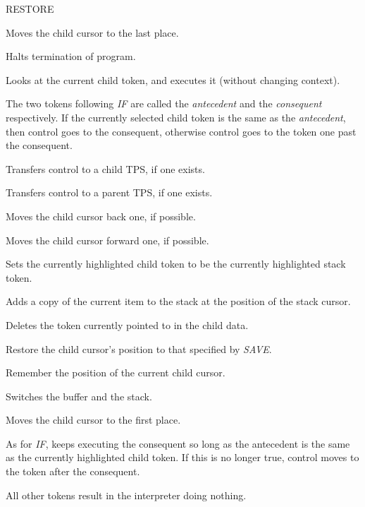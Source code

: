 \documentclass{article}
\begin{document}
\begin{labeling}{RESTORE}


\item [BOTTOM] 
Moves the child cursor to the last place.

\item [END]
Halts termination of program.

\item [EXEC]
Looks at the current child token, and executes it (without changing context).

\item [IF]
The two tokens following \emph{IF} are called the \emph{antecedent} and the \emph{consequent} respectively.  If the currently selected child token is the same as the \emph{antecedent}, then control goes to the consequent, otherwise control goes to the token one past the consequent.

\item [IN]
Transfers control to a child TPS, if one exists.

\item [OUT]
Transfers control to a parent TPS, if one exists.

\item [PREV] 
Moves the child cursor back one, if possible.

\item [NEXT] 
Moves the child cursor forward one, if possible.

\item [POP] 
Sets the currently highlighted child token to be the currently highlighted stack token.

\item [PUSH] 
Adds a copy of the current item to the stack at the position of the stack cursor.

\item [REMOVE]
Deletes the token currently pointed to in the child data.

\item [RESTORE]
Restore the child cursor's position to that specified by \emph{SAVE}.

\item [SAVE]
Remember the position of the current child cursor.

\item [SWITCH]
Switches the buffer and the stack.

\item [TOP] 
Moves the child cursor to the first place.

\item [WHILE]
As for \emph{IF}, keeps executing the consequent so long as the antecedent is the same as the currently highlighted child token. If this is no longer true, control moves to the token after the consequent.


\item
All other tokens result in the interpreter doing nothing.

\end{labeling}
\end{document}
